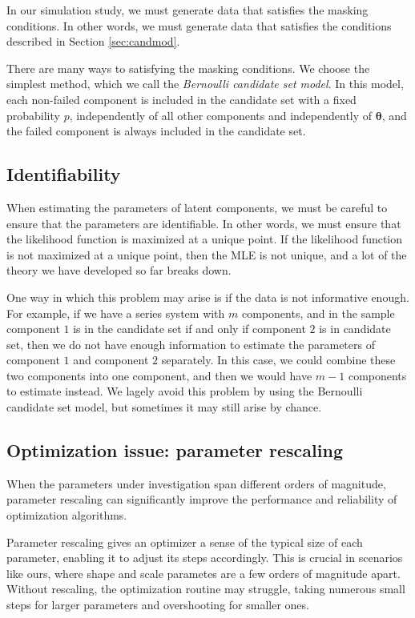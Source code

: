 \documentclass[
]{article}
\begin{document}
In our simulation study, we must generate data that satisfies the
masking conditions. In other words, we must generate data that satisfies
the conditions described in Section \ref{sec:candmod}.

There are many ways to satisfying the masking conditions. We choose the
simplest method, which we call the \emph{Bernoulli candidate set model}.
In this model, each non-failed component is included in the candidate
set with a fixed probability \(p\), independently of all other
components and independently of \(\boldsymbol{\theta}\), and the failed
component is always included in the candidate set.

\hypertarget{identifiability}{%
\subsection{Identifiability}\label{identifiability}}

When estimating the parameters of latent components, we must be careful
to ensure that the parameters are identifiable. In other words, we must
ensure that the likelihood function is maximized at a unique point. If
the likelihood function is not maximized at a unique point, then the MLE
is not unique, and a lot of the theory we have developed so far breaks
down.

One way in which this problem may arise is if the data is not
informative enough. For example, if we have a series system with \(m\)
components, and in the sample component \(1\) is in the candidate set if
and only if component \(2\) is in candidate set, then we do not have
enough information to estimate the parameters of component \(1\) and
component \(2\) separately. In this case, we could combine these two
components into one component, and then we would have \(m-1\) components
to estimate instead. We lagely avoid this problem by using the Bernoulli
candidate set model, but sometimes it may still arise by chance.

\hypertarget{sec:opt_rescale}{%
\subsection{Optimization issue: parameter
rescaling}\label{sec:opt_rescale}}

When the parameters under investigation span different orders of
magnitude, parameter rescaling can significantly improve the performance
and reliability of optimization algorithms.

Parameter rescaling gives an optimizer a sense of the typical size of
each parameter, enabling it to adjust its steps accordingly. This is
crucial in scenarios like ours, where shape and scale parametes are a
few orders of magnitude apart. Without rescaling, the optimization
routine may struggle, taking numerous small steps for larger parameters
and overshooting for smaller ones.
\end{document}
